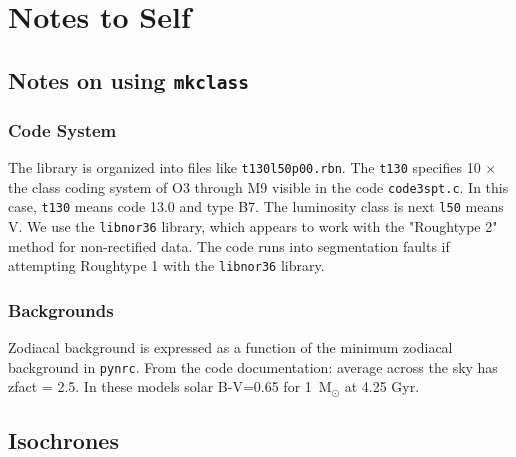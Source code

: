 \documentclass{aastex6}
\begin{document}





\clearpage
\pagebreak

\appendix

\section{Notes to Self}

\subsection{Notes on using \texttt{mkclass}}

\subsubsection{Code System}
The library is organized into files like \texttt{t130l50p00.rbn}.
The \texttt{t130} specifies 10 $\times$ the class coding system of O3 through M9 visible in the code \texttt{code3spt.c}.
In this case, \texttt{t130} means code 13.0 and type B7.
The luminosity class is next \texttt{l50} means V.
We use the \texttt{libnor36} library, which appears to work with the "Roughtype 2" method for non-rectified data.
The code runs into segmentation faults if attempting Roughtype 1 with the \texttt{libnor36} library.


\subsubsection{Backgrounds}

Zodiacal background is expressed as a function of the minimum zodiacal background in \texttt{pynrc}.
From the code documentation: average across the sky has zfact = 2.5.
In these models solar B-V=0.65 for 1~M$_\odot$ at 4.25 Gyr.

\subsection{Isochrones}
\end{document}
